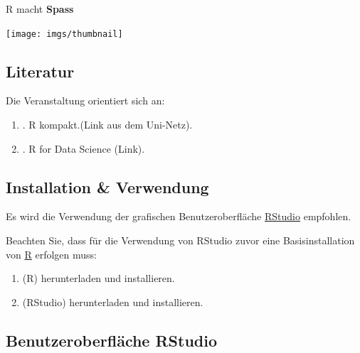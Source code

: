 \documentclass[
]{book}
\begin{document}
R macht \textbf{Spass}

\begin{center}\texttt{[image: imgs/thumbnail]} \end{center}

\hypertarget{literatur}{%
\subsection*{Literatur}\label{literatur}}

Die Veranstaltung orientiert sich an:

\begin{enumerate}
\def\labelenumi{\arabic{enumi}.}
\item
  \citet{wollschlaegerKompaktSchnelleEinstieg2016} . R kompakt.(Link aus dem Uni-Netz).
\item
  \citet{grolemundDataScience} . R for Data Science (Link).
\end{enumerate}

\hypertarget{installation-verwendung}{%
\subsection*{Installation \& Verwendung}\label{installation-verwendung}}

Es wird die Verwendung der grafischen Benutzeroberfläche \href{http://www.rstudio.com}{RStudio} empfohlen.

Beachten Sie, dass für die Verwendung von RStudio zuvor eine Basisinstallation von \href{http://cran.r-project.org}{R} erfolgen muss:

\begin{enumerate}
\def\labelenumi{\arabic{enumi}.}
\item
  (R) herunterladen und installieren.
\item
  (RStudio) herunterladen und installieren.
\end{enumerate}

\hypertarget{benutzeroberfluxe4che-rstudio}{%
\subsection*{Benutzeroberfläche RStudio}\label{benutzeroberfluxe4che-rstudio}}
\end{document}
